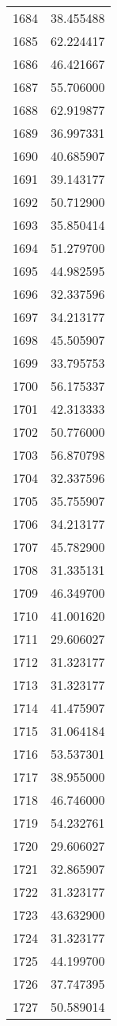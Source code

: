\documentclass[12pt]{article}
\begin{document}
\begin{longtable}{@{}cc@{}}
1684 & 38.455488 \\
1685 & 62.224417 \\
1686 & 46.421667 \\
1687 & 55.706000 \\
1688 & 62.919877 \\
1689 & 36.997331 \\
1690 & 40.685907 \\
1691 & 39.143177 \\
1692 & 50.712900 \\
1693 & 35.850414 \\
1694 & 51.279700 \\
1695 & 44.982595 \\
1696 & 32.337596 \\
1697 & 34.213177 \\
1698 & 45.505907 \\
1699 & 33.795753 \\
1700 & 56.175337 \\
1701 & 42.313333 \\
1702 & 50.776000 \\
1703 & 56.870798 \\
1704 & 32.337596 \\
1705 & 35.755907 \\
1706 & 34.213177 \\
1707 & 45.782900 \\
1708 & 31.335131 \\
1709 & 46.349700 \\
1710 & 41.001620 \\
1711 & 29.606027 \\
1712 & 31.323177 \\
1713 & 31.323177 \\
1714 & 41.475907 \\
1715 & 31.064184 \\
1716 & 53.537301 \\
1717 & 38.955000 \\
1718 & 46.746000 \\
1719 & 54.232761 \\
1720 & 29.606027 \\
1721 & 32.865907 \\
1722 & 31.323177 \\
1723 & 43.632900 \\
1724 & 31.323177 \\
1725 & 44.199700 \\
1726 & 37.747395 \\
1727 & 50.589014 \\

\end{longtable}
\end{document}
